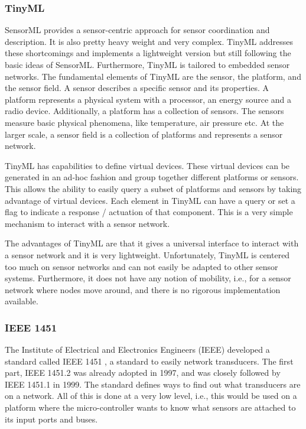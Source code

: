 \subsubsection{TinyML}
SensorML provides a sensor-centric approach for sensor coordination
and description. It is also pretty heavy weight and very
complex. TinyML \cite{ota:tmd} addresses these shortcomings and
implements a lightweight version but still following the basic ideas of SensorML.
Furthermore, TinyML is tailored
to embedded sensor networks. The fundamental elements of TinyML are
the sensor, the platform, and the sensor field. A sensor describes a
specific sensor and its properties. A platform represents a physical
system with a processor, an energy source and a radio
device. Additionally, a platform has a collection of sensors. The
sensors measure basic physical phenomena, like temperature, air
pressure etc. At the larger scale, a sensor field is a collection of
platforms and represents a sensor network.

TinyML has capabilities to define virtual devices. These virtual
devices can be generated in an ad-hoc fashion and group together
different platforms or sensors. This allows the ability to easily query 
a subset of platforms and sensors by taking advantage of virtual devices. 
Each element in
TinyML can have a query or set a flag to indicate a response / actuation
of that component. This is a very simple mechanism to interact with a
sensor network.

The advantages of TinyML are that it gives a universal interface to
interact with a sensor network and it is very
lightweight. Unfortunately, TinyML is centered too much on sensor
networks and can not easily be adapted to other sensor systems. Furthermore, it does 
not have any notion of mobility, i.e., for a sensor network
where nodes move around, and there is no rigorous
implementation available.


\subsubsection {IEEE 1451}
The Institute of Electrical and Electronics Engineers (IEEE) developed
a standard called IEEE 1451 \cite{lee2000iss}, a standard to easily network
transducers. The first part, IEEE 1451.2 was already adopted in 1997,
and was closely followed by IEEE 1451.1 in 1999. The standard defines
ways to find out what transducers are on a network. All of this is
done at a very low level, i.e., this would be used on a platform where
the micro-controller wants to know what sensors are attached to its
input ports and buses.


